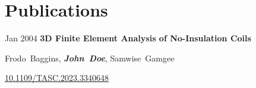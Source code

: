 \section{Publications}

\begin{samepage}
    \begin{twocolentry}{
        Jan 2004
    }
        \textbf{3D Finite Element Analysis of No-Insulation Coils}
    \end{twocolentry}

    \vspace{0.10 cm}
    
    \begin{onecolentry}
        \mbox{Frodo Baggins}, \mbox{\textbf{\textit{John Doe}}}, \mbox{Samwise Gamgee}

        \vspace{0.10 cm}
        
        \href{https://doi.org/10.1109/TASC.2023.3340648}{10.1109/TASC.2023.3340648}
    \end{onecolentry}
\end{samepage}
